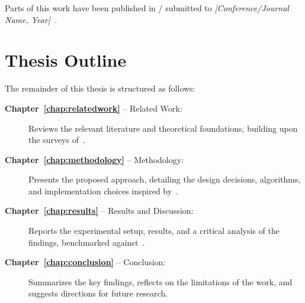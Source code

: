 Parts of this work have been published in / submitted to
\textit{[Conference/Journal Name, Year]}~\cite{ownpaper}.

\section{Thesis Outline}
\label{sec:outline}

The remainder of this thesis is structured as follows:

\begin{description}
    \item[\textbf{Chapter~\ref{chap:relatedwork}} -- Related Work:]
        Reviews the relevant literature and theoretical foundations,
        building upon the surveys of~\cite{survey2020field}.

    \item[\textbf{Chapter~\ref{chap:methodology}} -- Methodology:]
        Presents the proposed approach, detailing the design decisions,
        algorithms, and implementation choices inspired by~\cite{author_method2019}.

    \item[\textbf{Chapter~\ref{chap:results}} -- Results and Discussion:]
        Reports the experimental setup, results, and a critical analysis
        of the findings, benchmarked against~\cite{problemref2018}.

    \item[\textbf{Chapter~\ref{chap:conclusion}} -- Conclusion:]
        Summarizes the key findings, reflects on the limitations of the
        work, and suggests directions for future research.
\end{description}